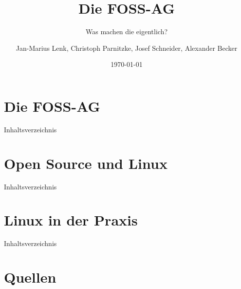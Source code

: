 \documentclass[12pt,utf8]{beamer}
\title{Die FOSS-AG}
\subtitle{Was machen die eigentlich?}
\author[J.-M. Lenk, C. Parnitzke, J. Schneider, A. Becker]{Jan-Marius Lenk, Christoph Parnitzke, Josef Schneider, Alexander Becker}
\institute[FOSS AG]{Free and Open Source Software AG\\ Fakultät für Informatik}
\date{\today}
\begin{document}
	\begin{frame}
		\titlepage
	\end{frame}

\section{Die FOSS-AG}

\begin{frame}{Inhaltsverzeichnis}
\end{frame}




\section{Open Source und Linux}

\begin{frame}{Inhaltsverzeichnis}
\end{frame}




\section{Linux in der Praxis}

\begin{frame}{Inhaltsverzeichnis}
\end{frame}




\section{Quellen}



\end{document}
